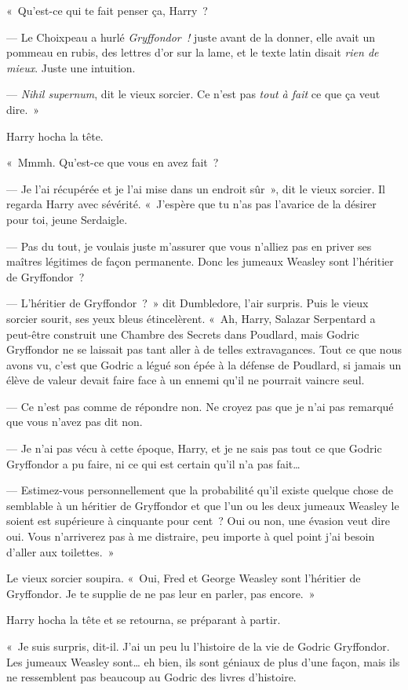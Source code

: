 «~Qu'est-ce qui te fait penser ça, Harry~?

--- Le Choixpeau a hurlé \emph{Gryffondor~!} juste avant de la donner, elle avait un pommeau en rubis, des lettres d'or sur la lame, et le texte latin disait \emph{rien de mieux}. Juste une intuition.

--- \emph{Nihil supernum}, dit le vieux sorcier. Ce n'est pas \emph{tout à fait} ce que ça veut dire.~»

Harry hocha la tête.

«~Mmmh. Qu'est-ce que vous en avez fait~?

--- Je l'ai récupérée et je l'ai mise dans un endroit sûr~», dit le vieux sorcier. Il regarda Harry avec sévérité. «~J'espère que tu n'as pas l'avarice de la désirer pour toi, jeune Serdaigle.

--- Pas du tout, je voulais juste m'assurer que vous n'alliez pas en priver ses maîtres légitimes de façon permanente. Donc les jumeaux Weasley sont l'héritier de Gryffondor~?

--- L'héritier de Gryffondor~?~» dit Dumbledore, l'air surpris. Puis le vieux sorcier sourit, ses yeux bleus étincelèrent. «~Ah, Harry, Salazar Serpentard a peut-être construit une Chambre des Secrets dans Poudlard, mais Godric Gryffondor ne se laissait pas tant aller à de telles extravagances. Tout ce que nous avons vu, c'est que Godric a légué son épée à la défense de Poudlard, si jamais un élève de valeur devait faire face à un ennemi qu'il ne pourrait vaincre seul.

--- Ce n'est pas comme de répondre non. Ne croyez pas que je n'ai pas remarqué que vous n'avez pas dit non.

--- Je n'ai pas vécu à cette époque, Harry, et je ne sais pas tout ce que Godric Gryffondor a pu faire, ni ce qui est certain qu'il n'a pas fait…

--- Estimez-vous personnellement que la probabilité qu'il existe quelque chose de semblable à un héritier de Gryffondor et que l'un ou les deux jumeaux Weasley le soient est supérieure à cinquante pour cent~? Oui ou non, une évasion veut dire oui. Vous n'arriverez pas à me distraire, peu importe à quel point j'ai besoin d'aller aux toilettes.~»

Le vieux sorcier soupira. «~Oui, Fred et George Weasley sont l'héritier de Gryffondor. Je te supplie de ne pas leur en parler, pas encore.~»

Harry hocha la tête et se retourna, se préparant à partir.

«~Je suis surpris, dit-il. J'ai un peu lu l'histoire de la vie de Godric Gryffondor. Les jumeaux Weasley sont… eh bien, ils sont géniaux de plus d'une façon, mais ils ne ressemblent pas beaucoup au Godric des livres d'histoire.

